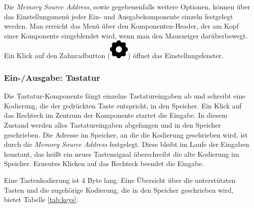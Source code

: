 Die \emph{Memory Source Address}, sowie gegebenenfalls weitere Optionen, können
über das Einstellungsmenü jeder Ein- und Ausgabekomponente einzeln festgelegt
werden. Man erreicht das Menü über den Komponenten-Header, der am Kopf einer
Komponente eingeblendet wird, wenn man den Mauszeiger darüberbewegt. Ein Klick
auf den Zahnradbutton (\includegraphics[scale=0.22, trim={0 2pt 0 0}, clip]{Images/SettingsIcon}) öffnet
das Einstellungsfenster.

\subsubsection{Ein-/Ausgabe: Tastatur}

Die Tastatur-Komponente fängt einzelne Tastatureingaben ab und schreibt eine
Kodierung, die der gedrückten Taste entspricht, in den Speicher. Ein Klick auf
das Rechteck im Zentrum der Komponente startet die Eingabe. In diesem Zustand
werden alles Tastatureingaben abgefangen und in den Speicher geschrieben. Die
Adresse im Speicher, an die die Kodierung geschrieben wird, ist durch die
\emph{Memory Source Address} festgelegt. Diese bleibt im Laufe der Eingaben
konstant, das heißt ein neues Tastensignal überschreibt die alte Kodierung im
Speicher. Erneutes Klicken auf das Rechteck beendet die Eingabe.

Eine Tastenkodierung ist 4 Byte lang. Eine Übersicht über die unterstützten
Tasten und die zugehörige Kodierung, die in den Speicher geschrieben wird,
bietet Tabelle \ref{tab:keys}.

